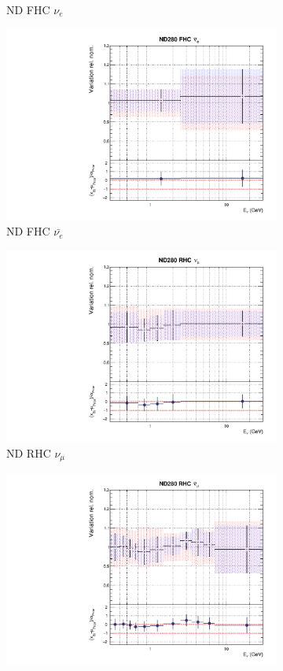 \begin{figure}[t]
\begin{subfigure}{0.42\textwidth}
  \caption{ND FHC $\nu_e$}
\end{subfigure}
\begin{subfigure}{0.42\textwidth}
  \centering
  \includegraphics[width=0.75\linewidth]{figs/rhcmpdat248flux_3}
  \caption{ND FHC $\bar{\nu_{e}}$}
\end{subfigure}
\begin{subfigure}{0.42\textwidth}
  \centering
  \includegraphics[width=0.75\linewidth]{figs/rhcmpdat248flux_4}
  \caption{ND RHC $\nu_{\mu}$}
\end{subfigure}
\begin{subfigure}{0.42\textwidth}
  \centering
  \includegraphics[width=0.75\linewidth]{figs/rhcmpdat248flux_5}

\end{subfigure}
\end{figure}
